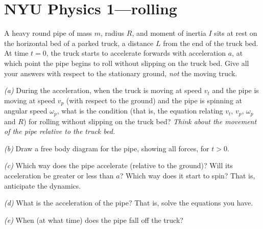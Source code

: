 \documentclass[12pt]{article}
\begin{document}
\thispagestyle{empty}

\section*{NYU Physics 1---rolling}

A heavy round pipe of mass $m$, radius $R$, and moment of inertia $I$
sits at rest on the horizontal bed of a parked truck, a distance $L$
from the end of the truck bed.  At time $t=0$, the truck starts to
accelerate forwards with acceleration $a$, at which point the pipe
begins to roll without slipping on the truck bed.  Give all your
answers with respect to the stationary ground, {\em not} the moving
truck.

\textsl{(a)} During the acceleration, when the truck is moving at
speed $v_t$ and the pipe is moving at speed $v_p$ (with respect to the
ground) and the pipe is spinning at angular speed $\omega_p$, what is
the condition (that is, the equation relating $v_t$, $v_p$, $\omega_p$
and $R$) for rolling without slipping on the truck bed?  \emph{Think
about the movement of the pipe relative to the truck bed.}

\textsl{(b)} Draw a free body diagram for the pipe, showing all
forces, for $t>0$.

\textsl{(c)} Which way does the pipe accelerate (relative to the
ground)?  Will its acceleration be greater or less than $a$?  Which
way does it start to spin?  That is, anticipate the dynamics.

\textsl{(d)} What is the acceleration of the pipe?  That is, solve the
equations you have.

\textsl{(e)} When (at what time) does the pipe fall off the truck?
\end{document}
